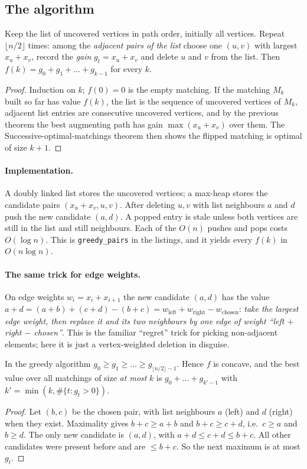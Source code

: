 \documentclass[11pt]{article}
\begin{document}
\subsection{The algorithm}
\begin{theorembox}
Keep the list of uncovered vertices in path order, initially all
vertices. Repeat $\lfloor n/2\rfloor$ times: among the \emph{adjacent pairs
of the list} choose one $(u,v)$ with largest $x_u+x_v$, record the
\emph{gain} $g_t=x_u+x_v$ and delete $u$ and $v$ from the list.
Then $f(k)=g_0+g_1+\dots+g_{k-1}$ for every $k$.
\end{theorembox}
\begin{proof}
Induction on $k$; $f(0)=0$ is the empty matching. If the matching $M_k$
built so far has value $f(k)$, the list is the sequence of uncovered
vertices of $M_k$, adjacent list entries are consecutive uncovered
vertices, and by the previous theorem the best augmenting path has gain
$\max(x_u+x_v)$ over them. The Successive-optimal-matchings theorem then
shows the flipped matching is optimal of size $k+1$.
\end{proof}

\paragraph{Implementation.} A doubly linked list stores the uncovered
vertices; a max-heap stores the candidate pairs $(x_u+x_v,u,v)$. After
deleting $u,v$ with list neighbours $a$ and $d$ push the new candidate
$(a,d)$. A popped entry is stale unless both vertices are still in the list
and still neighbours. Each of the $O(n)$ pushes and pops costs $O(\log n)$.
This is \texttt{greedy\_pairs} in the listings, and it yields every
$f(k)$ in $O(n\log n)$.

\paragraph{The same trick for edge weights.} On edge weights
$w_i=x_i+x_{i+1}$ the new candidate $(a,d)$ has the value
$a+d=(a+b)+(c+d)-(b+c)=w_{\text{left}}+w_{\text{right}}-w_{\text{chosen}}$:
\emph{take the largest edge weight, then replace it and its two
neighbours by one edge of weight ``left $+$ right $-$ chosen''}. This is the
familiar ``regret'' trick for picking non-adjacent elements; here it is
just a vertex-weighted deletion in disguise.

\begin{theorembox}
In the greedy algorithm $g_0\ge g_1\ge\dots\ge g_{\lfloor n/2\rfloor-1}$.
Hence $f$ is concave, and the best value over all matchings of size
\emph{at most} $k$ is $g_0+\dots+g_{k'-1}$ with $k'=\min(k,\#\{t:g_t>0\})$.
\end{theorembox}
\begin{proof}
Let $(b,c)$ be the chosen pair, with list neighbours $a$ (left) and $d$ (right)
when they exist. Maximality gives $b+c\ge a+b$ and $b+c\ge c+d$, i.e.\ $c\ge a$
and $b\ge d$. The only new candidate is $(a,d)$, with
$a+d\le c+d\le b+c$. All other candidates were present before and are
$\le b+c$. So the next maximum is at most $g_t$.
\end{proof}
\end{document}
